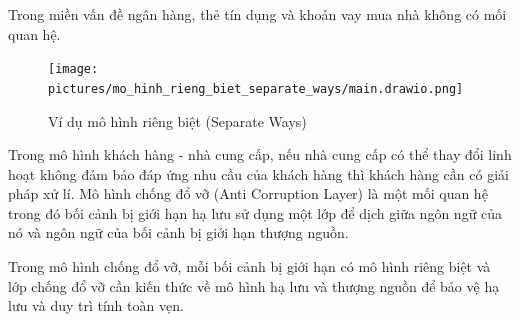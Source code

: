










\begin{example} Trong miền vấn đề ngân hàng, thẻ tín dụng và khoản vay mua nhà không có mối quan hệ.

    \begin{figure}[H]

        \centering

        \texttt{[image: pictures/mo\_hinh\_rieng\_biet\_separate\_ways/main.drawio.png]}

        \caption{Ví dụ mô hình riêng biệt (Separate Ways)}

    \end{figure}

\end{example}


Trong mô hình khách hàng - nhà cung cấp, nếu nhà cung cấp có thể thay đổi linh hoạt không đảm bảo đáp ứng nhu cầu của khách hàng thì khách hàng cần có giải pháp xử lí. Mô hình chống đổ vỡ (Anti Corruption Layer) là một mối quan hệ trong đó bối cảnh bị giới hạn hạ lưu sử dụng một lớp để dịch giữa ngôn ngữ của nó và ngôn ngữ của bối cảnh bị giới hạn thượng nguồn.

Trong mô hình chống đổ vỡ, mỗi bối cảnh bị giới hạn có mô hình riêng biệt và lớp chống đổ vỡ cần kiến thức về mô hình hạ lưu và thượng nguồn để bảo vệ hạ lưu và duy trì tính toàn vẹn.



